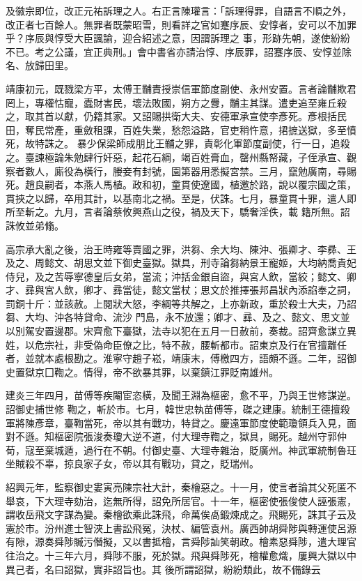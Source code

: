 \begin{pinyinscope}
 及徽宗即位，改正元祐訴理之人。右正言陳瓘言：「訴理得罪，自語言不順之外，改正者七百餘人。無罪者既蒙昭雪，則看詳之官如蹇序辰、安惇者，安可以不加罪乎？序辰與惇受大臣諷諭，迎合紹述之意，因謂訴理之
 事，形跡先朝，遂使紛紛不已。考之公議，宜正典刑。」會中書省亦請治惇、序辰罪，詔蹇序辰、安惇並除名、放歸田里。



 靖康初元，既戮梁方平，太傅王黼責授崇信軍節度副使、永州安置。言者論黼欺君罔上，專權怙寵，蠹財害民，壞法敗國，朔方之釁，黼主其謀。遣吏追至雍丘殺之，取其首以獻，仍籍其家。又詔賜拱衛大夫、安德軍承宣使李彥死。彥根括民田，奪民常產，重斂租課，百姓失業，愁怨溢路，官吏稍忤意，捃摭送獄，多至憤死，故特誅之。
 暴少保梁師成朋比王黼之罪，責彰化軍節度副使，行一日，追殺之。臺諫極論朱勉肆行奸惡，起花石綱，竭百姓膏血，罄州縣帑藏，子侄承宣、觀察者數人，廝役為橫行，媵妾有封號，園第器用悉擬宮禁。三月，竄勉廣南，尋賜死。趙良嗣者，本燕人馬植。政和初，童貫使遼國，植邀於路，說以覆宗國之策，貫挾之以歸，卒用其計，以基南北之禍。至是，伏誅。七月，暴童貫十罪，遣人即所至斬之。九月，言者論蔡攸興燕山之役，禍及天下，驕奢淫佚，載
 籍所無。詔誅攸並弟翛。



 高宗承大亂之後，治王時雍等賣國之罪，洪芻、余大均、陳沖、張卿才、李彞、王及之、周懿文、胡思文並下御史臺獄。獄具，刑寺論芻納景王寵姬，大均納喬貴妃侍兒，及之苦辱寧德皇后女弟，當流；沖括金銀自盜，與宮人飲，當絞；懿文、卿才、彞與宮人飲，卿才、彞當徒，懿文當杖；思文於推擇張邦昌狀內添諂奉之詞，罰銅十斤：並該赦。上閱狀大怒，李綱等共解之，上亦新政，重於殺士大夫，乃詔芻、大均、沖各特貸命、流沙
 門島，永不放還；卿才、彞、及之、懿文、思文並以別駕安置邊郡。宋齊愈下臺獄，法寺以犯在五月一日赦前，奏裁。詔齊愈謀立異姓，以危宗社，非受偽命臣僚之比，特不赦，腰斬都市。詔東京及行在官擅離任者，並就本處根勘之。淮寧守趙子崧，靖康末，傅檄四方，語頗不遜。二年，詔御史置獄京囗鞫之。情得，帝不欲暴其罪，以棄鎮江罪貶南雄州。



 建炎三年四月，苗傅等疾閹宦恣橫，及聞王淵為樞密，愈不平，乃與王世修謀逆。詔御史捕世修
 鞫之，斬於市。七月，韓世忠執苗傅等，磔之建康。統制王德擅殺軍將陳彥章，臺鞫當死，帝以其有戰功，特貸之。慶遠軍節度使範瓊領兵入見，面對不遜。知樞密院張浚奏瓊大逆不道，付大理寺鞫之，獄具，賜死。越州守郭仲荀，寇至棄城遁，過行在不朝。付御史臺、大理寺雜治，貶廣州。神武軍統制魯玨坐賊殺不辜，掠良家子女，帝以其有戰功，貸之，貶瑞州。



 紹興元年，監察御史婁寅亮陳宗社大計，秦檜惡之。十一月，使言者論其父死匿不
 舉哀，下大理寺劾治，迄無所得，詔免所居官。十一年，樞密使張俊使人誣張憲，謂收岳飛文字謀為變。秦檜欲乘此誅飛，命萬俟卨鍛煉成之。飛賜死，誅其子云及憲於市。汾州進士智浹上書訟飛冤，決杖、編管袁州。廣西帥胡舜陟與轉運使呂源有隙，源奏舜陟贓污僭擬，又以書抵檜，言舜陟訕笑朝政。檜素惡舜陟，遣大理官往治之。十三年六月，舜陟不服，死於獄。飛與舜陟死，檜權愈熾，屢興大獄以中異己者，名曰詔獄，實非詔旨也。其
 後所謂詔獄，紛紛類此，故不備錄云



\end{pinyinscope}